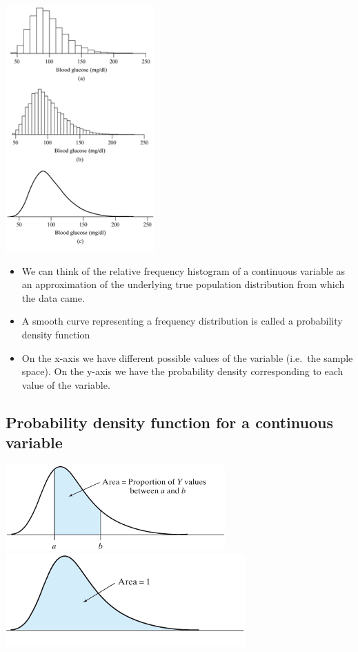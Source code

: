 \documentclass[
]{book}
\providecommand{\tightlist}{%
  \setlength{\itemsep}{0pt}\setlength{\parskip}{0pt}}
\begin{document}
\includegraphics[width=0.5\linewidth]{./2_45}

\begin{itemize}
\tightlist
\item
  We can think of the relative frequency histogram of a continuous variable as an approximation of the underlying true population distribution from which the data came.
\item
  A smooth curve representing a frequency distribution is called a probability density function
\item
  On the x-axis we have different possible values of the variable (i.e.~the sample space). On the y-axis we have the probability density corresponding to each value of the variable.
\end{itemize}

\hypertarget{probability-density-function-for-a-continuous-variable}{%
\subsection{Probability density function for a continuous variable}\label{probability-density-function-for-a-continuous-variable}}

\includegraphics[width=0.5\linewidth]{./2_46a}
\includegraphics[width=0.5\linewidth]{./2_46b}
\end{document}
